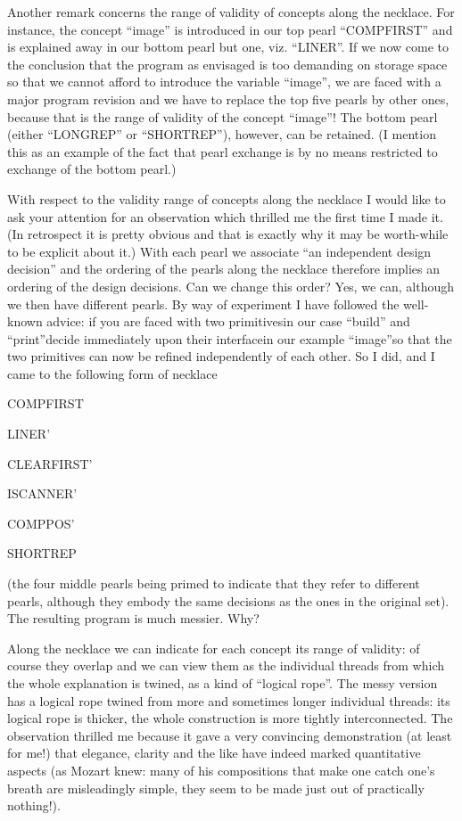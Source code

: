 \documentclass[twoside,11pt]{book}
\begin{document}
Another remark concerns the range of validity of concepts along the necklace. For instance, the concept ``image'' is introduced in our top pearl ``COMPFIRST'' and is explained away in our bottom pearl but one, viz. ``LINER''. If we now come to the conclusion that the program as envisaged is too demanding on storage space so that we cannot afford to introduce the variable ``image'', we are faced with a major program revision and we have to replace the top five pearls by other ones, because that is the range of validity of the concept ``image''! The bottom pearl (either ``LONGREP'' or ``SHORTREP''), however, can be retained. (I mention this as an example of the fact that pearl exchange is by no means restricted to exchange of the bottom pearl.)

With respect to the validity range of concepts along the necklace I would like to ask your attention for an observation which thrilled me the first time I made it. (In retrospect it is pretty obvious and that is exactly why it may be worth-while to be explicit about it.) With each pearl we associate ``an independent design decision'' and the ordering of the pearls along the necklace therefore implies an ordering of the design decisions. Can we change this order? Yes, we can, although we then have different pearls. By way of experiment I have followed the well-known advice: if you are faced with two primitives\textemdash{}in our case ``build'' and ``print''\textemdash{}decide immediately upon their interface\textemdash{}in our example ``image''\textemdash{}so that the two primitives can now be refined independently of each other. So I did, and I came to the following form of necklace

COMPFIRST

LINER'

CLEARFIRST'

ISCANNER'

COMPPOS'

SHORTREP

\noindent
(the four middle pearls being primed to indicate that they refer to different pearls, although they embody the same decisions as the ones in the original set). The resulting program is much messier. Why?

Along the necklace we can indicate for each concept its range of validity: of course they overlap and we can view them as the individual threads from which the whole explanation is twined, as a kind of ``logical rope''. The messy version has a logical rope twined from more and sometimes longer individual threads: its logical rope is thicker, the whole construction is more tightly interconnected. The observation thrilled me because it gave a very convincing demonstration (at least for me!) that elegance, clarity and the like have indeed marked quantitative aspects (as Mozart knew: many of his compositions that make one catch one's breath are misleadingly simple, they seem to be made just out of practically nothing!).
\end{document}
